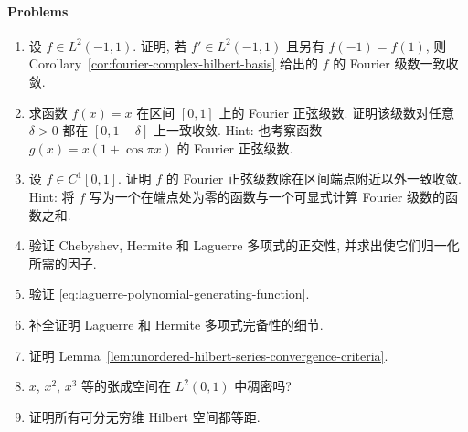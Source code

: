 \paragraph*{Problems}

\begin{enumerate}[label=\thesection.\arabic*.,ref=\thesection.\arabic*,start=15,series=book-problems]

\item\label{ex:periodic-fourier-uniform-convergence} 设 $f\in L^2(-1,1)$. 证明, 若 $f'\in L^2(-1,1)$ 且另有 $f(-1)=f(1)$, 则 Corollary~\ref{cor:fourier-complex-hilbert-basis} 给出的 $f$ 的 Fourier 级数一致收敛.

\item\label{ex:fourier-sine-series-linear-function} 求函数 $f(x)=x$ 在区间 $[0,1]$ 上的 Fourier 正弦级数. 证明该级数对任意 $\delta>0$ 都在 $[0,1-\delta]$ 上一致收敛. Hint: 也考察函数 $g(x)=x(1+\cos\pi x)$ 的 Fourier 正弦级数.

\item\label{ex:fourier-sine-series-interior-uniform-convergence} 设 $f\in C^1[0,1]$. 证明 $f$ 的 Fourier 正弦级数除在区间端点附近以外一致收敛. Hint: 将 $f$ 写为一个在端点处为零的函数与一个可显式计算 Fourier 级数的函数之和.

\item\label{ex:classical-polynomials-orthogonality-normalization} 验证 Chebyshev, Hermite 和 Laguerre 多项式的正交性, 并求出使它们归一化所需的因子.

\item\label{ex:laguerre-generating-function} 验证 \eqref{eq:laguerre-polynomial-generating-function}.

\item\label{ex:laguerre-hermite-completeness-details} 补全证明 Laguerre 和 Hermite 多项式完备性的细节.

\item\label{ex:hilbert-series-convergence-criteria} 证明 Lemma~\ref{lem:unordered-hilbert-series-convergence-criteria}.

\item\label{ex:positive-power-span-lp-two-density} $x$, $x^2$, $x^3$ 等的张成空间在 $L^2(0,1)$ 中稠密吗?

\item\label{ex:separable-infinite-hilbert-spaces-isometry} 证明所有可分无穷维 Hilbert 空间都等距.

\end{enumerate}
